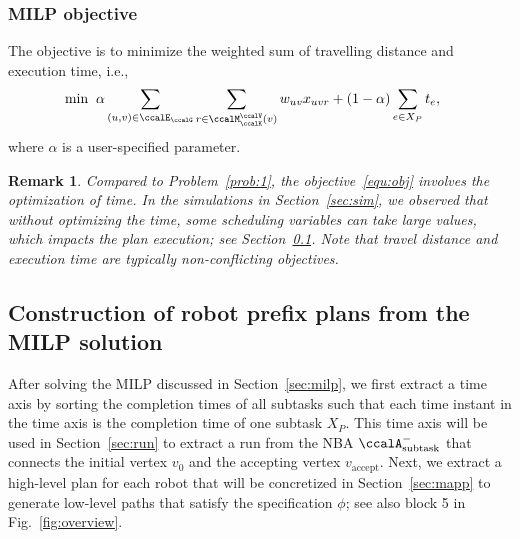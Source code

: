 \documentclass[Afour,sageh,times]{sagej}
\newtheorem{rem}[thm]{Remark}
\newcommand{\auto}[1]{\ccalA_{\text{#1}}}
\begin{document}
{{\subsubsection{MILP objective}The objective is to minimize the weighted sum of travelling distance and execution time, i.e.,
\begingroup\makeatletter\def\f@size{10}\check@mathfonts
\def\maketag@@@#1{\hbox{\m@th\normalsize\normalfont#1}}%
\begin{align}\label{equ:obj}
  \min \; \;&  \alpha \sum_{(u,v)\in \ccalE_\ccalG}  \sum_{r \in \ccalM^\ccalV_{\ccalK}(v)} w_{uv} x_{uvr} +  (1 - \alpha) \sum_{e\in X_P} t_e,
\end{align}
 \endgroup
  where $\alpha$ is a user-specified parameter.
  \begin{rem}
   Compared to Problem~\ref{prob:1}, the objective~\eqref{equ:obj} involves the optimization of time. In the simulations in Section~\ref{sec:sim}, we observed that without optimizing the time, some scheduling variables can take large values, which impacts the plan execution; see Section~\ref{sec:path}. Note that travel distance and execution time are typically non-conflicting objectives.

  \end{rem}
\subsection{Construction of robot prefix plans from the MILP solution}\label{sec:path}
After solving the MILP discussed in Section~\ref{sec:milp}, we first extract a time axis by sorting the completion times of all subtasks such that each time instant in the time axis is the completion time of one subtask $X_P$. This time axis  will be used in Section~\ref{sec:run} to extract a run from the NBA $\auto{subtask}^-$ that connects the initial vertex $v_0$ and the accepting vertex $v_\text{accept}$. Next, we extract a high-level plan for each robot  that will be concretized in Section~\ref{sec:mapp} to generate low-level paths that satisfy the specification $\phi$; see also block 5 in Fig.~\ref{fig:overview}.


}}
\end{document}
